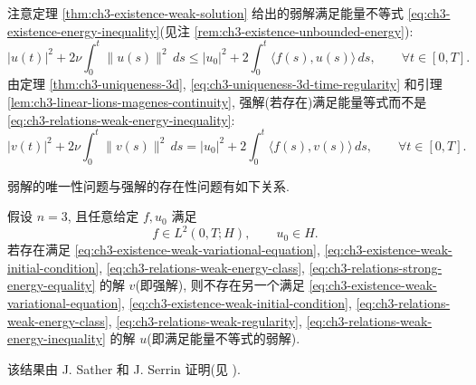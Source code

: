 注意定理 \ref{thm:ch3-existence-weak-solution} 给出的弱解满足能量不等式 \eqref{eq:ch3-existence-energy-inequality}(见注 \ref{rem:ch3-existence-unbounded-energy}):
\begin{equation}
|u(t)|^2+2\nu\int_0^t\lVert u(s)\rVert^2\,ds
\leq|u_0|^2+2\int_0^t\langle f(s),u(s)\rangle\,ds,
\qquad\forall t\in[0,T].
\label{eq:ch3-relations-weak-energy-inequality}
\end{equation}
由定理 \ref{thm:ch3-uniqueness-3d}, \eqref{eq:ch3-uniqueness-3d-time-regularity} 和引理 \ref{lem:ch3-linear-lions-magenes-continuity}, 强解(若存在)满足能量等式而不是 \eqref{eq:ch3-relations-weak-energy-inequality}:
\begin{equation}
|v(t)|^2+2\nu\int_0^t\lVert v(s)\rVert^2\,ds
=|u_0|^2+2\int_0^t\langle f(s),v(s)\rangle\,ds,
\qquad\forall t\in[0,T].
\label{eq:ch3-relations-strong-energy-equality}
\end{equation}

弱解的唯一性问题与强解的存在性问题有如下关系.

\begin{Theorem}
\label{thm:ch3-weak-strong-uniqueness}
假设 $n=3$, 且任意给定 $f,u_0$ 满足
\begin{equation}
f\in L^2(0,T;H),
\qquad u_0\in H.
\label{eq:ch3-relations-data}
\end{equation}
若存在满足 \eqref{eq:ch3-existence-weak-variational-equation}, \eqref{eq:ch3-existence-weak-initial-condition}, \eqref{eq:ch3-relations-weak-energy-class}, \eqref{eq:ch3-relations-strong-energy-equality} 的解 $v$(即强解), 则不存在另一个满足 \eqref{eq:ch3-existence-weak-variational-equation}, \eqref{eq:ch3-existence-weak-initial-condition}, \eqref{eq:ch3-relations-weak-energy-class}, \eqref{eq:ch3-relations-weak-regularity}, \eqref{eq:ch3-relations-weak-energy-inequality} 的解 $u$(即满足能量不等式的弱解).

该结果由 J. Sather 和 J. Serrin 证明(见 ).
\end{Theorem}

